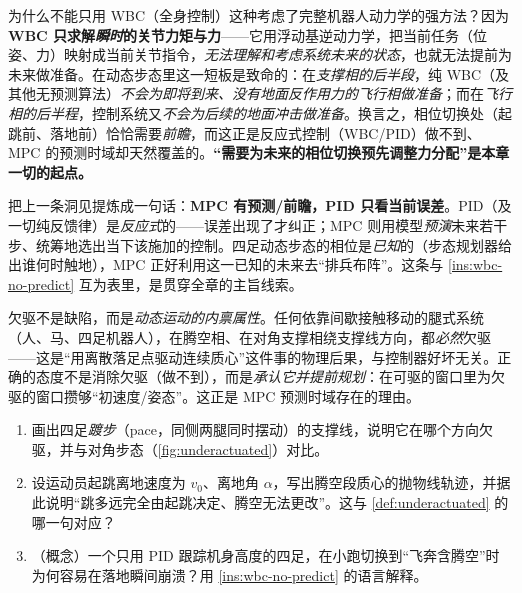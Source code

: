 \begin{insight}\label{ins:wbc-no-predict}
为什么不能只用 WBC（全身控制）这种考虑了完整机器人动力学的强方法？因为\textbf{WBC 只求解\emph{瞬时}的关节力矩与力}——它用浮动基逆动力学，把当前任务（位姿、力）映射成当前关节指令，\emph{无法理解和考虑系统未来的状态}，也就无法提前为未来做准备。在动态步态里这一短板是致命的：在\emph{支撑相的后半段}，纯 WBC（及其他无预测算法）\emph{不会为即将到来、没有地面反作用力的飞行相做准备}；而在\emph{飞行相的后半程}，控制系统又\emph{不会为后续的地面冲击做准备}。换言之，相位切换处（起跳前、落地前）恰恰需要\emph{前瞻}，而这正是反应式控制（WBC/PID）做不到、MPC 的预测时域却天然覆盖的。\textbf{“需要为未来的相位切换预先调整力分配”是本章一切的起点。}
\end{insight}

\begin{insight}\label{ins:mpc-vs-pid}
把上一条洞见提炼成一句话：\textbf{MPC 有预测/前瞻，PID 只看当前误差}。PID（及一切纯反馈律）是\emph{反应式}的——误差出现了才纠正；MPC 则用模型\emph{预演}未来若干步、统筹地选出当下该施加的控制。四足动态步态的相位是\emph{已知}的（步态规划器给出谁何时触地），MPC 正好利用这一已知的未来去“排兵布阵”。这条与 \cref{ins:wbc-no-predict} 互为表里，是贯穿全章的主旨线索。
\end{insight}

\begin{pitfall}[误区：“欠驱 = 控制器设计失败/硬件不行”]
欠驱不是缺陷，而是\emph{动态运动的内禀属性}。任何依靠间歇接触移动的腿式系统（人、马、四足机器人），在腾空相、在对角支撑相绕支撑线方向，都\emph{必然}欠驱——这是“用离散落足点驱动连续质心”这件事的物理后果，与控制器好坏无关。正确的态度不是消除欠驱（做不到），而是\emph{承认它并提前规划}：在可驱的窗口里为欠驱的窗口攒够“初速度/姿态”。这正是 MPC 预测时域存在的理由。
\end{pitfall}

\begin{practice}
\begin{enumerate}
  \item 画出四足\emph{踱步}（pace，同侧两腿同时摆动）的支撑线，说明它在哪个方向欠驱，并与对角步态（\cref{fig:underactuated}）对比。
  \item 设运动员起跳离地速度为 $v_0$、离地角 $\alpha$，写出腾空段质心的抛物线轨迹，并据此说明“跳多远完全由起跳决定、腾空无法更改”。这与 \cref{def:underactuated} 的哪一句对应？
  \item （概念）一个只用 PID 跟踪机身高度的四足，在小跑切换到“飞奔含腾空”时为何容易在落地瞬间崩溃？用 \cref{ins:wbc-no-predict} 的语言解释。
\end{enumerate}
\end{practice}

